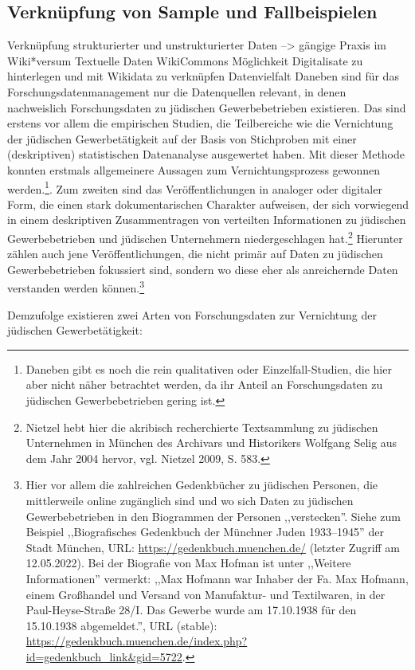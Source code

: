 \subsection{Verknüpfung von Sample und Fallbeispielen}
Verknüpfung strukturierter und unstrukturierter Daten --> gängige Praxis im Wiki*versum
Textuelle Daten
WikiCommons Möglichkeit Digitalisate zu hinterlegen und mit Wikidata zu verknüpfen
Datenvielfalt
Daneben sind für das Forschungsdatenmanagement nur die Datenquellen relevant, in denen nachweislich Forschungsdaten zu jüdischen Gewerbebetrieben existieren. Das sind erstens vor allem die empirischen Studien, die Teilbereiche wie die Vernichtung der jüdischen Gewerbetätigkeit auf der Basis von Stichproben mit einer (deskriptiven) statistischen Datenanalyse ausgewertet haben. Mit dieser Methode konnten erstmals allgemeinere Aussagen zum Vernichtungsprozess gewonnen werden.\footnote{Daneben gibt es noch die rein qualitativen oder Einzelfall-Studien, die hier aber nicht näher betrachtet werden, da ihr Anteil an Forschungsdaten zu jüdischen Gewerbebetrieben gering ist.}. Zum zweiten sind das Veröffentlichungen in analoger oder digitaler Form, die einen stark dokumentarischen Charakter aufweisen, der sich vorwiegend in einem deskriptiven Zusammentragen von verteilten Informationen zu jüdischen Gewerbebetrieben und jüdischen Unternehmern niedergeschlagen hat.\footnote{Nietzel hebt hier die akribisch recherchierte Textsammlung zu jüdischen Unternehmen in München des Archivars und Historikers Wolfgang Selig aus dem Jahr 2004 hervor, vgl. Nietzel 2009, S. 583.} Hierunter zählen auch jene Veröffentlichungen, die nicht primär auf Daten zu jüdischen Gewerbebetrieben fokussiert sind, sondern wo diese eher als anreichernde Daten verstanden werden können.\footnote{Hier vor allem die zahlreichen Gedenkbücher zu jüdischen Personen, die mittlerweile online zugänglich sind und wo sich Daten zu jüdischen Gewerbebetrieben in den Biogrammen der Personen ,,verstecken''. Siehe zum Beispiel ,,Biografisches Gedenkbuch der Münchner Juden 1933–1945'' der Stadt München, URL: \url{https://gedenkbuch.muenchen.de/} (letzter Zugriff am 12.05.2022). Bei der Biografie von Max Hofman ist unter ,,Weitere Informationen'' vermerkt: ,,Max Hofmann war Inhaber der Fa. Max Hofmann, einem Großhandel und Versand von Manufaktur- und Textilwaren, in der Paul-Heyse-Straße 28/I. Das Gewerbe wurde am 17.10.1938 für den 15.10.1938 abgemeldet.'', URL (stable): \url{https://gedenkbuch.muenchen.de/index.php?id=gedenkbuch_link&gid=5722}.}

Demzufolge existieren zwei Arten von Forschungsdaten zur Vernichtung der jüdischen Gewerbetätigkeit:


